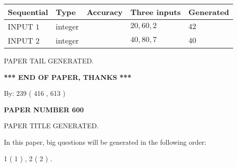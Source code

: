 \documentclass[12pt]{article}
\begin{document}
   
  
  
\noindent\begin{tabular}{|l|l|l|l|l|}
\hline
 Sequential & Type & Accuracy & Three inputs & Generated \\ 
\hline
 
 
  INPUT $  1 $ & integer &  & $
 20
 , 
 60
 , 
 2
 $ & $ 42 $ 
 \\  \hline  
 
 
  INPUT $  2 $ & integer &  & $
 40
 , 
 80
 , 
 7
 $ & $ 40 $ 
 \\  \hline  
 \end{tabular}
   
   
   
   
   
   
 \vspace{0.2in}
 
   
   
\vspace{2.0in} PAPER TAIL GENERATED.
   
   
   
   
\vspace{1.0in} 
{\textbf{\large{ *** END OF PAPER, THANKS *** }}} 
   
   
\hspace{1.0in} By: 
 239 ( 416 ,  613 )
   
   
   
   
\newpage 
\setcounter{page}{ 
   600001 } 
   
   
   
   
 {\textbf{ \Large{ PAPER NUMBER  600  }}}
   
   
\vspace{0.2in}
   
   
   
   
   
   
   
   
 \vspace{0.2in}
 
 
 
 
   
   
 PAPER TITLE GENERATED.
   
   
   
\vspace{0.2in}
   
In this paper, big questions will be generated in the following order: 
   
   
   1 ( 1 )
 ,
   2 ( 2 )
 .
  
\end{document}
